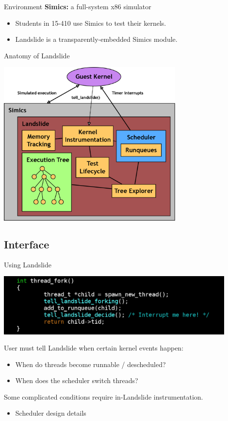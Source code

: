 \documentclass[xcolor=dvipsnames]{beamer}
\begin{document}
\begin{frame}{Environment}
	\textbf{Simics:} a full-system x86 simulator
	\begin{itemize}
		\item Students in 15-410 use Simics to test their kernels.
		\item Landslide is a transparently-embedded Simics module.
	\end{itemize}
\end{frame}

\begin{frame}{Anatomy of Landslide}
	\begin{center}
	\includegraphics[width=0.7\textwidth]{landslide.png}
	\end{center}
\end{frame}

\subsection{Interface}

\begin{frame}{Using Landslide}
	\begin{center}
	\includegraphics[width=0.9\textwidth]{tell_landslide.png}
	\end{center}
	User must tell Landslide when certain kernel events happen:
	\begin{itemize}
		\item When do threads become runnable / descheduled?
		\item When does the scheduler switch threads?
	\end{itemize}
	\linegap
	Some complicated conditions require in-Landslide instrumentation.
	\begin{itemize}
		\item Scheduler design details
	\end{itemize}
\end{frame}
\end{document}
